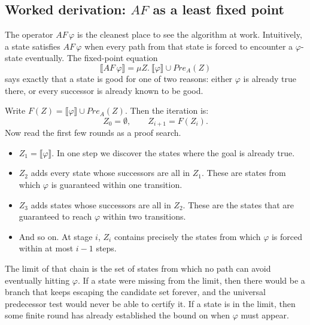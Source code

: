 \subsection{Worked derivation: $AF$ as a least fixed point}

The operator $AF\,\varphi$ is the cleanest place to see the algorithm at
work.  Intuitively, a state satisfies $AF\,\varphi$ when every path from that
state is forced to encounter a $\varphi$-state eventually.  The fixed-point
equation
\[
  \llbracket AF\,\varphi \rrbracket = \mu Z.\ \llbracket \varphi \rrbracket \cup Pre_A(Z)
\]
says exactly that a state is good for one of two reasons: either $\varphi$ is
already true there, or every successor is already known to be good.

Write $F(Z) = \llbracket \varphi \rrbracket \cup Pre_A(Z)$.  Then the
iteration is:
\[
  Z_0 = \emptyset,\qquad Z_{i+1} = F(Z_i).
\]
Now read the first few rounds as a proof search.
\begin{itemize}
  \item $Z_1 = \llbracket \varphi \rrbracket$.  In one step we discover the
        states where the goal is already true.
  \item $Z_2$ adds every state whose successors are all in $Z_1$.  These are
        states from which $\varphi$ is guaranteed within one transition.
  \item $Z_3$ adds states whose successors are all in $Z_2$.  These are the
        states that are guaranteed to reach $\varphi$ within two transitions.
  \item And so on.  At stage $i$, $Z_i$ contains precisely the states from
        which $\varphi$ is forced within at most $i-1$ steps.
\end{itemize}

The limit of that chain is the set of states from which no path can avoid
eventually hitting $\varphi$.  If a state were missing from the limit, then
there would be a branch that keeps escaping the candidate set forever, and the
universal predecessor test would never be able to certify it.  If a state is
in the limit, then some finite round has already established the bound on when
$\varphi$ must appear.

